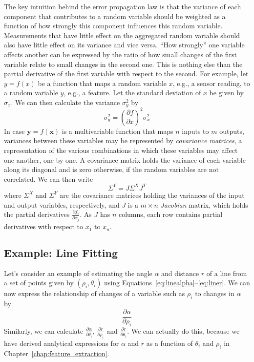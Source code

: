 The key intuition behind the error propagation law is that the variance of each component that contributes to a random variable should
be weighted as a function of how strongly this component influences this random variable. Measurements that have little effect on the
aggregated random variable should also have little effect on its variance and vice versa. ``How strongly'' one variable affects another
can be expressed by the ratio of how small changes of the first variable relate to small changes in the second one. This is nothing else
than the partial derivative of the first variable with respect to the second. For example, let $y=f(x)$ be a function that maps a random variable $x$, e.g., a sensor reading, to a random variable $y$, e.g., a feature. Let the standard deviation of $x$ be given by $\sigma_x$. We can then calculate the variance $\sigma_y^2$ by
\begin{equation}
\sigma_y^2=\left(\frac{\partial f}{\partial x}\right)^2 \sigma_x^2
\end{equation}
In case $\mathbf{y}=f(\mathbf{x})$ is a multivariable function that maps $n$ inputs to $m$ outputs, variances between these
variables may be represented by \emph{covariance matrices}, a representation of the various combinations in
which these variables may affect one another, one by one. A covariance matrix holds the variance of each variable along its diagonal and is zero otherwise, if the random variables are not correlated. We can then write
\begin{equation}
\Sigma^Y= J \Sigma^X J^T
\end{equation}
where $\Sigma^X$ and $\Sigma^Y$ are the covariance matrices holding the variances of the input and output variables, respectively, and
$J$ is a $m \times n$ \emph{Jacobian} matrix, which holds the partial derivatives $\frac{\partial f_i}{\partial x_j}$. As $J$ has $n$ columns, each row contains partial derivatives with respect to $x_1$ to $x_n$.

\subsection{Example: Line Fitting}\label{sec:linefitting}
Let's consider an example of estimating the angle $\alpha$ and distance $r$ of a line from a set of points given by $(\rho_i,\theta_i)$ using Equations~\ref{eq:linealpha}--\ref{eq:liner}. We can now express the relationship of changes of a variable such as $ \rho_i$ to changes in $ \alpha$ by
\begin{equation}
\frac{\partial \alpha}{\partial \rho_i}
\end{equation}
Similarly, we can calculate $ \frac{\partial \alpha}{\partial \theta_i}$, $ \frac{\partial r}{\partial \rho_i}$ and $ \frac{\partial r}{\partial \theta_i}$. We can actually do this, because we have derived analytical expressions for $ \alpha$ and $ r$ as a function of $ \theta_i$ and $ \rho_i$ in Chapter~\ref{chap:feature_extraction}.

